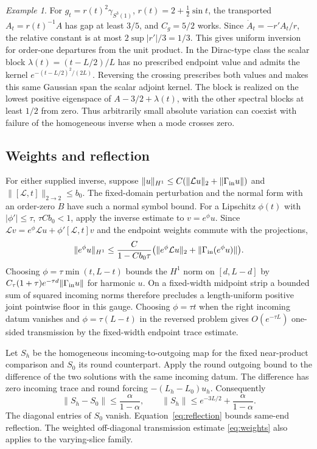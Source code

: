 \documentclass[11pt]{article}
\theoremstyle{remark}
\newtheorem{example}[theorem]{Example}
\begin{document}
\begin{example}
For \(g_t=r(t)^2\gamma_{S^3(1)}\), \(r(t)=2+\tfrac12\sin t\), the transported \(A_t=r(t)^{-1}A\) has gap at least \(3/5\), and \(C_g=5/2\) works. Since \(\dot A_t=-r'A_t/r\), the relative constant is at most \(2\sup|r'|/3=1/3\). This gives uniform inversion for order-one departures from the unit product. In the Dirac-type class the scalar block \(\lambda(t)=(t-L/2)/L\) has no prescribed endpoint value and admits the kernel \(e^{-(t-L/2)^2/(2L)}\). Reversing the crossing prescribes both values and makes this same Gaussian span the scalar adjoint kernel. The block is realized on the lowest positive eigenspace of \(A-3/2+\lambda(t)\), with the other spectral blocks at least \(1/2\) from zero. Thus arbitrarily small absolute variation can coexist with failure of the homogeneous inverse when a mode crosses zero.
\end{example}

\subsection{Weights and reflection}
For either supplied inverse, suppose \(\|u\|_{H^1}\le C(\|\mathcal L u\|_2+\|\Gamma_{\rm in}u\|)\) and \(\|[\mathcal L,t]\|_{2\to2}\le b_0\). The fixed-domain perturbation and the normal form with an order-zero \(B\) have such a normal symbol bound. For a Lipschitz \(\phi(t)\) with \(|\phi'|\le\tau\), \(\tau Cb_0<1\), apply the inverse estimate to \(v=e^\phi u\). Since
\(\mathcal L v=e^\phi\mathcal L u+\phi'[\mathcal L,t]v\) and the endpoint weights commute with the projections,
\begin{equation}
 \|e^\phi u\|_{H^1}\le
 \frac{C}{1-Cb_0\tau}
      \bigl(\|e^\phi\mathcal L u\|_2+\|\Gamma_{\rm in}(e^\phi u)\|\bigr).
 \label{eq:weights}
\end{equation}
Choosing \(\phi=\tau\min(t,L-t)\) bounds the \(H^1\) norm on \([d,L-d]\) by \(C_\tau(1+\tau)e^{-\tau d}\|\Gamma_{\rm in}u\|\) for harmonic \(u\). On a fixed-width midpoint strip a bounded sum of squared incoming norms therefore precludes a length-uniform positive joint pointwise floor in this gauge. Choosing \(\phi=\tau t\) when the right incoming datum vanishes and \(\phi=\tau(L-t)\) in the reversed problem gives \(O(e^{-\tau L})\) one-sided transmission by the fixed-width endpoint trace estimate.

Let \(S_h\) be the homogeneous incoming-to-outgoing map for the fixed near-product comparison and \(S_0\) its round counterpart. Apply the round outgoing bound to the difference of the two solutions with the same incoming datum. The difference has zero incoming trace and round forcing \(-(L_h-L_0)u_h\). Consequently
\begin{equation}
 \|S_h-S_0\|\le\frac{\alpha}{1-\alpha},\qquad
 \|S_h\|\le e^{-3L/2}+\frac{\alpha}{1-\alpha} .
 \label{eq:reflection}
\end{equation}
The diagonal entries of \(S_0\) vanish. Equation~\eqref{eq:reflection} bounds same-end reflection. The weighted off-diagonal transmission estimate \eqref{eq:weights} also applies to the varying-slice family.
\end{document}
